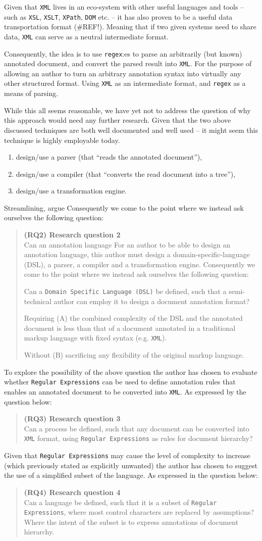 \documentclass{scrreprt}
\newcommand\researchquestionformat[1]{\begin{quote}#1\end{quote}}
\newcommand\secondresearchquestion{\researchquestionformat{%
  \textbf{(RQ2) Research question 2} \\
  Can an annotation language
  For an author to be able to design an annotation language, this author must design a domain-specific-language (DSL), a parser, a compiler and a transformation engine. Consequently we come to the point where we instead ask ourselves the following question:


  Can a \texttt{Domain Specific Language (DSL)} be defined, such that a semi-technical author can employ it to design a document annotation format?

  Requiring (A) the combined complexity of the DSL and the annotated document is less than that of a document annotated in a traditional markup language with fixed syntax (e.g. \texttt{XML}).

  Without (B) sacrificing any flexibility of the original markup language.
}}
\newcommand\thirdresearchquestion{\researchquestionformat{%
  \textbf{(RQ3) Research question 3} \\
  Can a process be defined, such that any document can be converted into \texttt{XML} format, using \texttt{Regular Expressions} as rules for document hierarchy?
}}
\newcommand\fourthresearchquestion{\researchquestionformat{%
  \textbf{(RQ4) Research question 4} \\
  Can a language be defined, such that it is a subset of \texttt{Regular Expressions}, where most control characters are replaced by assumptions? Where the intent of the subset is to express annotations of document hierarchy.
}}
\begin{document}
Given that \texttt{XML} lives in an eco-system with other useful languages and tools -- such as \texttt{XSL}, \texttt{XSLT}, \texttt{XPath}, \texttt{DOM} etc. -- it has also proven to be a useful data transportation format (\#REF!). Meaning that if two given systems need to share data, \texttt{XML} can serve as a neutral intermediate format.

Consequently, the idea is to use \texttt{regex}:es to parse an arbitrarily (but known) annotated document, and convert the parsed result into \texttt{XML}. For the purpose of allowing an author to turn an arbitrary annotation syntax into virtually any other structured format. Using \texttt{XML} as an intermediate format, and \texttt{regex} as a means of parsing.

While this all seems reasonable, we have yet not to address the question of why this approach would need any further research. Given that the two above discussed techniques are both well documented and well used -- it might seem this technique is highly employable today.

\begin{enumerate}
\item design/use a parser (that ``reads the annotated document''),
\item design/use a compiler (that ``converts the read document into a tree''),
\item design/use a transformation engine.
\end{enumerate}


Streamlining,   argue  Consequently we come to the point where we instead ask ourselves the following question:

\secondresearchquestion

To explore the possibility of the above question the author has chosen to evaluate whether \texttt{Regular Expressions} can be used to define annotation rules that enables an annotated document to be converted into \texttt{XML}. As expressed by the question below:

\thirdresearchquestion

Given that \texttt{Regular Expressions} may cause the level of complexity to increase (which previously stated as explicitly unwanted) the author has chosen to suggest the use of a simplified subset of the language. As expressed in the question below:

\fourthresearchquestion
\end{document}
